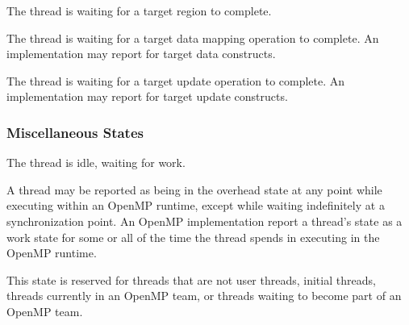 \begin{description}

\item {} 

  The thread is waiting for a target region to complete.
  
\item {} 

  The thread is waiting for a target data mapping operation to complete. 
  An implementation may report  
  for target data constructs.

\item {} 

  The thread is waiting for a target  update operation to complete. 
  An implementation may report  
  for target update constructs.

\end{description}


\subsubsection{Miscellaneous States}

\begin{description}
\item {} 

  The thread is idle, waiting for work.

\item {} 

  A thread may be reported as being in the overhead state at any point while 
  executing within an OpenMP runtime, except while waiting indefinitely
  at a synchronization point.
  An OpenMP implementation report a thread's state as a work state for
  some or all of the time the thread spends in executing in the OpenMP runtime.

\item {} 

  This state is reserved for threads that are not user threads,
  initial threads, threads currently in an OpenMP team, or threads
  waiting to become part of an OpenMP team.

\end{description}

